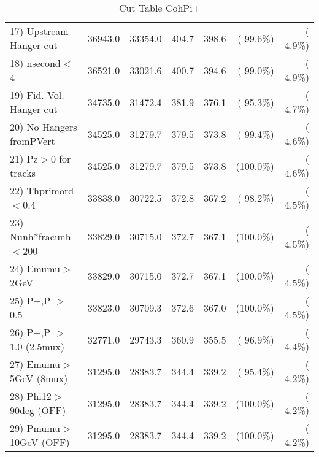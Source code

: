 \begin{table}[h!]
\begin{tabular}{||l||r|r|r|r|r|r||}
 17) Upstream Hanger cut  &      36943.0 &      33354.0 &        404.7 &        398.6 & ( 99.6\%) & (  4.9\%) \\
 18) nsecond$<$4          &      36521.0 &      33021.6 &        400.7 &        394.6 & ( 99.0\%) & (  4.9\%) \\
 19) Fid. Vol. Hanger cut &      34735.0 &      31472.4 &        381.9 &        376.1 & ( 95.3\%) & (  4.7\%) \\
 20) No Hangers fromPVert &      34525.0 &      31279.7 &        379.5 &        373.8 & ( 99.4\%) & (  4.6\%) \\
 21) Pz$>$0 for tracks    &      34525.0 &      31279.7 &        379.5 &        373.8 & (100.0\%) & (  4.6\%) \\
 22) Thprimord$<$0.4      &      33838.0 &      30722.5 &        372.8 &        367.2 & ( 98.2\%) & (  4.5\%) \\
 23) Nunh*fracunh$<$200   &      33829.0 &      30715.0 &        372.7 &        367.1 & (100.0\%) & (  4.5\%) \\
 24) Emumu$>$2GeV         &      33829.0 &      30715.0 &        372.7 &        367.1 & (100.0\%) & (  4.5\%) \\
 25) P+,P-$>$0.5          &      33823.0 &      30709.3 &        372.6 &        367.0 & (100.0\%) & (  4.5\%) \\
 26) P+,P-$>$1.0 (2.5mux) &      32771.0 &      29743.3 &        360.9 &        355.5 & ( 96.9\%) & (  4.4\%) \\
 27) Emumu$>$5GeV  (8mux) &      31295.0 &      28383.7 &        344.4 &        339.2 & ( 95.4\%) & (  4.2\%) \\
 28) Phi12$>$90deg  (OFF) &      31295.0 &      28383.7 &        344.4 &        339.2 & (100.0\%) & (  4.2\%) \\
 29) Pmumu$>$10GeV  (OFF) &      31295.0 &      28383.7 &        344.4 &        339.2 & (100.0\%) & (  4.2\%) \\
 \hline
 \hline
 \end{tabular}
 \caption{Cut Table  CohPi+   }
 \label{tab-cutcohjpsi-mumu_cohpip}
 \end{table}
